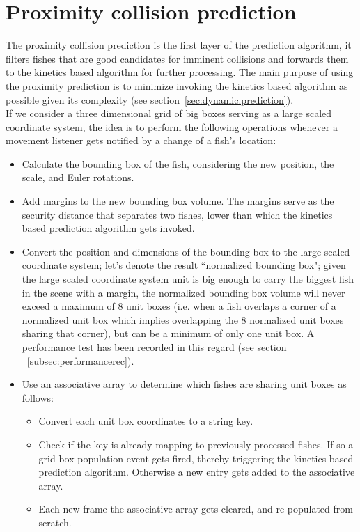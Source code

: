 \section{Proximity collision prediction}
\label{sec:static.prediction}

The proximity collision prediction is the first layer of the prediction algorithm, it filters fishes that are good candidates for imminent collisions and forwards them to the kinetics based algorithm for further processing. The main purpose of using the proximity prediction is to minimize invoking the kinetics based algorithm as possible given its complexity (see section~\ref{sec:dynamic.prediction}).\\

If we consider a three dimensional grid of big boxes serving as a large scaled coordinate system, the idea is to perform the following operations whenever a movement listener gets notified by a change of a fish's location:
\begin{itemize}

\item Calculate the bounding box of the fish, considering the new position, the scale, and Euler rotations.

\item Add margins to the new bounding box volume. The margins serve as the security distance that separates two fishes, lower than which the kinetics based prediction algorithm gets invoked.

\item Convert the position and dimensions of the bounding box to the large scaled coordinate system; let's denote the result ``normalized bounding box"; given the large scaled coordinate system unit is big enough to carry the biggest fish in the scene with a margin, the normalized bounding box volume will never exceed a maximum of 8 unit boxes (i.e. when a fish overlaps a corner of a normalized unit box which implies overlapping the 8 normalized unit boxes sharing that corner), but can be a minimum of only one unit box. A performance test has been recorded in this regard (see section ~\ref{subsec:performancerec}).

\item Use an associative array to determine which fishes are sharing unit boxes as follows:

\begin{itemize}

\item Convert each unit box coordinates to a string key.

\item Check if the key is already mapping to previously processed fishes. If so a grid box population event gets fired, thereby triggering the kinetics based prediction algorithm. Otherwise a new entry gets added to the associative array. 

\item Each new frame the associative array gets cleared, and re-populated from scratch.

\end{itemize}
\end{itemize}

